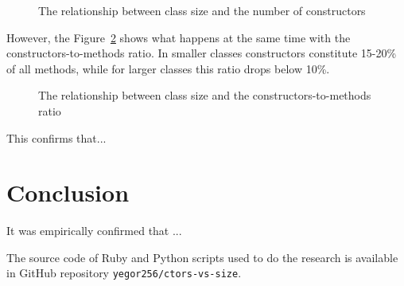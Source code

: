 \documentclass[12pt]{article}
\begin{document}
\begin{figure}[h]
  
  \caption{The relationship between class size and the number of constructors}
  \label{fig:1}
\end{figure}

However, the Figure~\ref{fig:2} shows what happens at the same time
with the constructors-to-methods ratio. In smaller classes constructors
constitute 15-20\% of all methods, while for larger classes this ratio
drops below 10\%.

\begin{figure}[h]
  
  \caption{The relationship between class size and the constructors-to-methods ratio}
  \label{fig:2}
\end{figure}

This confirms that...

\section{Conclusion}

It was empirically confirmed that ...

The source code of Ruby and Python scripts used to do the research
is available in GitHub repository \texttt{yegor256/ctors-vs-size}.


\end{document}
